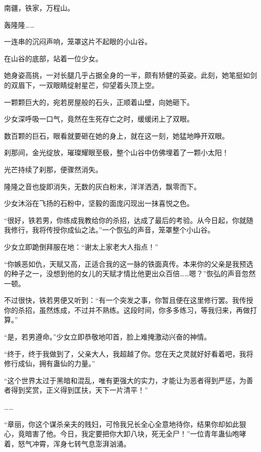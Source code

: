 
\begin{this_body}

南疆，铁家，万程山。

轰隆隆……

一连串的沉闷声响，笼罩这片不起眼的小山谷。

在山谷的底部，站着一位少女。

她身姿高挑，一对长腿几乎占据全身的一半，颇有矫健的英姿。此刻，她笔挺如剑的双眉下，一双眼睛绽射星芒，仰望着头顶上空。

一颗颗巨大的，宛若房屋般的石头，正顺着山壁，向她砸下。

少女深呼吸一口气，竟然在生死存亡之时，缓缓闭上了双眼。

数百颗的巨石，眼看就要砸在她的身上，就在这一刻，她猛地睁开双眼。

刹那间，金光绽放，璀璨耀眼至极，整个山谷中仿佛埋着了一颗小太阳！

光芒持续了刹那，便骤然消失。

隆隆之音也旋即消失，无数的灰白粉末，洋洋洒洒，飘零而下。

少女沐浴在飞扬的石粉中，坚毅的面庞闪现出一抹喜悦之色。

“很好，铁若男，你练成我教给你的杀招，达成了最后的考验。从今日起，你就随我修行，我将传授你成仙之法。”一个恢弘的声音，笼罩整个小山谷。

少女立即跪倒拜服在地：“谢太上家老大人指点！”

“你嫉恶如仇，天赋又高，正适合我的这一脉的铁面真传。本来你的父亲是我预选的种子之一，没想到他的女儿的天赋才情比他更出众百倍……嗯？”恢弘的声音忽然一顿。

不过很快，铁若男便又听到：“有一个突发之事，你暂且便在这里修行罢。我传授你的杀招，虽然炼成，不过并不熟练。这段时间，你多多练习，等我归来，再做打算。”

“是，若男遵命。”少女立即恭敬地叩首，脸上难掩激动兴奋的神情。

“终于，终于我做到了，父亲大人，我超越了你。您在天之灵就好好看着吧，我将修行成仙，拥有蛊仙的力量。”

“这个世界太过于黑暗和混乱，唯有更强大的实力，才能让为恶者得到严惩，为善者得到奖赏，正义得到匡扶，天下一片清平！”

……

“章丽，你这个谋杀亲夫的贱妇，可怜我兄长全心全意地待你，结果你却如此狠心，竟暗害了他。今日，我定要把你大卸八块，死无全尸！”一位青年蛊仙咆哮着，怒气冲霄，浑身七转气息澎湃汹涌。


\end{this_body}
